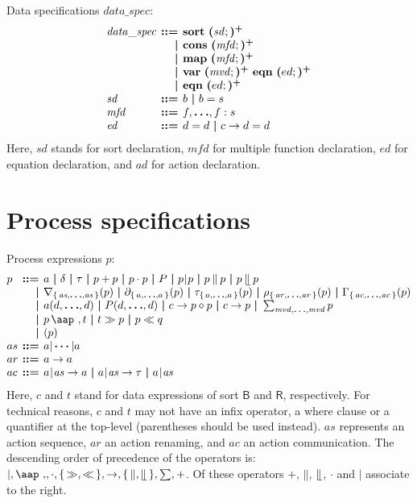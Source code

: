 \documentclass[a4paper,fleqn,10pt]{article}
\makeatletter
\newcommand{\f}[1]{\ensuremath{\mathit{#1}}}
\newcommand{\sbool}{\ensuremath{\mathsf{B}}}
\newcommand{\sreal}{\ensuremath{\mathsf{R}}}
\newenvironment{tightarray}[1]
  {\setlength{\arraycolsep}{2pt}%
   \begin{array}{@{}#1@{}}%
  }
  {\end{array}%
  }
\newcommand{\set}[1]{\ensuremath{\{\,#1\,\}}}
\newcommand{\seq}{\mathbin{\cdot}}
\newcommand{\alt}{\mathbin{+}}
\newcommand{\pmerge}{\mathbin{\parallel}}
\newcommand{\lmerge}{\mathbin{\llfloor}}
\newcommand{\sync}{\mathbin{\!\mid\!}}
\newcommand{\block}[1]{\partial_{#1}}
\newcommand{\hide}[1]{\tau_{#1}}
\newcommand{\ren}[1]{\rho_{#1}}
\newcommand{\allow}[1]{\nabla_{#1}}
\newcommand{\comm}[1]{\Gamma_{#1}}
\newcommand{\at}[1]{\mbox{\aap ,} #1}
\newcommand{\pinit}{\gg}
\newcommand{\pbefore}{\ll}
\newcommand{\mb}[1]{\text{\boldmath$#1$}}
\newcommand{\kwsort}{{\bf sort}}
\newcommand{\kwcons}{{\bf cons}}
\newcommand{\kwmap}{{\bf map}}
\newcommand{\kwvar}{{\bf var}}
\newcommand{\kweqn}{{\bf eqn}}
\makeatother
\begin{document}
Data specifications $\f{data\_spec}$:
\[\begin{tightarray}{lrl}
\f{data\_spec}
& \mb{::=} & \kwsort\ \mb{(}\f{sd};\mb{)^{+}}\\
& \mb{|}   & \kwcons\ \mb{(}\f{mfd};\mb{)^{+}}\\
& \mb{|}   & \kwmap\  \mb{(}\f{mfd};\mb{)^{+}}\\
& \mb{|}   & \kwvar\  \mb{(}\f{mvd};\mb{)^{+}}\ \kweqn\ \mb{(}ed;\mb{)^{+}}\\
& \mb{|}   & \kweqn\  \mb{(}ed;\mb{)^{+}}\\
\f{sd}  & \mb{::=} & b\ \mb{|}\ b = s\\
\f{mfd} & \mb{::=} & f, \mb{\ldots}, f: s\\
\f{ed}  & \mb{::=} & d = d\ \mb{|}\ c \to d = d\\
\end{tightarray}\]
Here, $\f{sd}$ stands for sort declaration,
$\f{mfd}$ for multiple function declaration,
$\f{ed}$ for equation declaration,
and $\f{ad}$ for action declaration.

\section{Process specifications}

Process expressions $p$:
\[\begin{tightarray}{lrl}
p   & \mb{::=} & a\ \mb{|}\ \delta\ \mb{|}\ \tau\ \mb{|}\ p \alt p\ \mb{|}\ p \seq p\ \mb{|}\ P\ \mb{|}\ 
            p \sync p\ \mb{|}\ p \pmerge p\ \mb{|}\ p \lmerge p\\
    & \mb{|} & \allow{\set{\f{as},\mb{\ldots},\f{as}}}(p)\ \mb{|}\ 
            \block{\set{a,\mb{\ldots},a}}(p)\ \mb{|}\ 
            \hide{\set{a,\mb{\ldots},a}}(p)\ \mb{|}\ 
            \ren{\set{\f{ar},\mb{\ldots},\f{ar}}}(p)\ \mb{|}\ 
            \comm{\set{\f{ac},\mb{\ldots},\f{ac}}}(p)\\
    & \mb{|} & a(d, \mb{\ldots}, d)\ \mb{|}\ 
            P(d, \mb{\ldots}, d)\ \mb{|}\ 
            c \to p \diamond p\ \mb{|}\ 
            c \to p\ \mb{|}\  
            \sum_{\f{mvd},\mb{\ldots},\f{mvd}}p\\
     & \mb{|} & p\,\at\,t\ \mb{|}\ t \pinit p\ \mb{|}\ p \pbefore q\\ 
     & \mb{|} & ( p )\\
as  & \mb{::=} & a |\,\mb{\cdots} | a\\
ar  & \mb{::=} & a \to a\\
ac  & \mb{::=} & a\sync\f{as} \to a\ \mb{|}\ a\sync\f{as} \to \tau\ \mb{|}\ a\sync\f{as}\\
\end{tightarray}\]
Here, $c$ and $t$ stand for data expressions of sort $\sbool$ and $\sreal$,
respectively.
For technical reasons, $c$ and $t$ may not have an infix operator, a
where clause or a quantifier at the top-level (parentheses should be
used instead).
$\f{as}$ represents an action sequence, $\f{ar}$ an action
renaming, and $\f{ac}$ an action communication. The descending order of
precedence of the operators is: $\mid, \at, \seq, \set{\pinit, \pbefore}, \to,
\set{\pmerge,\lmerge},\sum,\alt$. Of these operators $\alt$, $\pmerge$,
$\lmerge$, $\seq$ and $\mid$ associate to the right.
\end{document}
